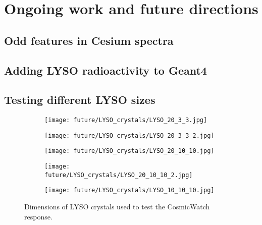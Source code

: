 \chapter{Ongoing work and future directions}

\section{Odd features in Cesium spectra}

\section{Adding LYSO radioactivity to Geant4}

\section{Testing different LYSO sizes}

\begin{figure}
    \centering
    \begin{subfigure}[t]{0.4\textwidth}
        \texttt{[image: future/LYSO\_crystals/LYSO\_20\_3\_3.jpg]}
    \end{subfigure}
    \begin{subfigure}[t]{0.4\textwidth}
        \texttt{[image: future/LYSO\_crystals/LYSO\_20\_3\_3\_2.jpg]}
    \end{subfigure}
    \medskip
    \centering
    \begin{subfigure}[t]{0.4\textwidth}
        \texttt{[image: future/LYSO\_crystals/LYSO\_20\_10\_10.jpg]}
    \end{subfigure}
    \begin{subfigure}[t]{0.4\textwidth}
        \texttt{[image: future/LYSO\_crystals/LYSO\_20\_10\_10\_2.jpg]}
    \end{subfigure}
    \medskip
    \begin{subfigure}[t]{\textwidth}
        \centering
        \texttt{[image: future/LYSO\_crystals/LYSO\_10\_10\_10.jpg]}
    \end{subfigure}
    \caption{\label{fig:LYSO_crystals}Dimensions of LYSO crystals used to test the CosmicWatch response.}
\end{figure}